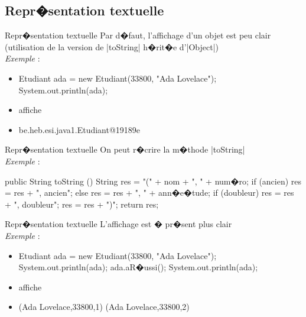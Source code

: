 \subsection{Repr�sentation textuelle}

\begin{frame}[fragile]{Repr�sentation textuelle}
Par d�faut, l'affichage d'un objet est peu clair
\\(utilisation de la version de \java|toString| h�rit�e d'\java|Object|)
\\\bigskip
\emph{Exemple} :
  \begin{itemize}
  \item[]
  \begin{Java}
  Etudiant ada = new Etudiant(33800, "Ada Lovelace");
  System.out.println(ada);
  \end{Java}
  \item[]affiche
  \item[]
  \begin{Java}
  be.heb.esi.java1.Etudiant@19189e
  \end{Java}
  \end{itemize}
\end{frame}

\begin{frame}[fragile]{Repr�sentation textuelle}
On peut r�crire la m�thode \java|toString|
\\\bigskip
\emph{Exemple} :
\begin{Java}
  public String toString () {
    String res = "(" + nom + ", " + num�ro;
    if (ancien) {
        res = res + ", ancien";
    } else {
        res = res + ", " + ann�e�tude;
        if (doubleur) { 
            res = res + ", doubleur";
        }
    }
    res = res + ")";
    return res;
  }
\end{Java}
\end{frame}

\begin{frame}[fragile]{Repr�sentation textuelle}
L'affichage est � pr�sent plus clair
\\\bigskip
\emph{Exemple} :
  \begin{itemize}
  \item[]
  \begin{Java}
  Etudiant ada = new Etudiant(33800, "Ada Lovelace");
  System.out.println(ada);
  ada.aR�ussi(); 
  System.out.println(ada);
  \end{Java}
  \item[] affiche
  \item[]
  \begin{Java}
  (Ada Lovelace,33800,1)
  (Ada Lovelace,33800,2)
  \end{Java}
  \end{itemize}
\end{frame}


